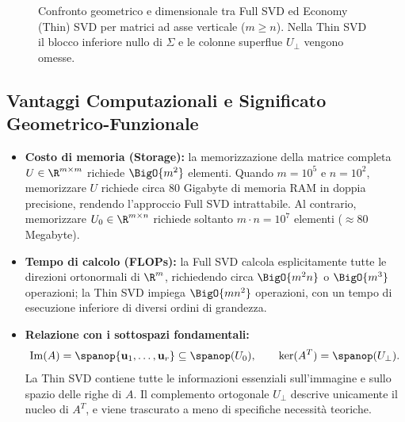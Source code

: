 \begin{figure}[H]
{
}
\caption{Confronto geometrico e dimensionale tra Full SVD ed Economy (Thin) SVD per matrici ad asse verticale ($m \ge n$). Nella Thin SVD il blocco inferiore nullo di $\Sigma$ e le colonne superflue $U_{\perp}$ vengono omesse.}
\label{fig:full-vs-thin-svd-structure}
\end{figure}

\subsection{Vantaggi Computazionali e Significato Geometrico-Funzionale}

\begin{itemize}
    \item \textbf{Costo di memoria (Storage):} la memorizzazione della matrice completa $U \in \R^{m \times m}$ richiede $\BigO{m^2}$ elementi. Quando $m = 10^5$ e $n = 10^2$, memorizzare $U$ richiede circa $80$ Gigabyte di memoria RAM in doppia precisione, rendendo l'approccio Full SVD intrattabile. Al contrario, memorizzare $U_0 \in \R^{m \times n}$ richiede soltanto $m \cdot n = 10^7$ elementi ($\approx 80$ Megabyte).
    \item \textbf{Tempo di calcolo (FLOPs):} la Full SVD calcola esplicitamente tutte le direzioni ortonormali di $\R^m$, richiedendo circa $\BigO{m^2 n}$ o $\BigO{m^3}$ operazioni; la Thin SVD impiega $\BigO{m n^2}$ operazioni, con un tempo di esecuzione inferiore di diversi ordini di grandezza.
    \item \textbf{Relazione con i sottospazi fondamentali:}
    \begin{equation}
        \operatorname{Im}(A) = \spanop\{\mathbf{u}_1, \dots, \mathbf{u}_r\} \subseteq \spanop(U_0), \qquad \ker(A^T) = \spanop(U_{\perp}).
    \end{equation}
    La Thin SVD contiene tutte le informazioni essenziali sull'immagine e sullo spazio delle righe di $A$. Il complemento ortogonale $U_{\perp}$ descrive unicamente il nucleo di $A^T$, e viene trascurato a meno di specifiche necessit\`a teoriche.
\end{itemize}

